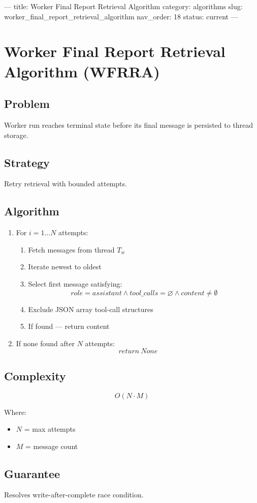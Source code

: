 ---
title: Worker Final Report Retrieval Algorithm
category: algorithms
slug: worker_final_report_retrieval_algorithm
nav_order: 18
status: current
---

\section{Worker Final Report Retrieval Algorithm (WFRRA)}

\subsection*{Problem}

Worker run reaches terminal state before its final message is
persisted to thread storage.

\subsection*{Strategy}

Retry retrieval with bounded attempts.

\subsection*{Algorithm}

\begin{enumerate}

\item For $i = 1 \dots N$ attempts:

\begin{enumerate}
    \item Fetch messages from thread $T_w$
    \item Iterate newest to oldest
    \item Select first message satisfying:
    \[
    role = assistant
    \land tool\_calls = \varnothing
    \land content \neq \emptyset
    \]
    \item Exclude JSON array tool-call structures
    \item If found — return content
\end{enumerate}

\item If none found after $N$ attempts:
\[
return\ None
\]

\end{enumerate}

\subsection*{Complexity}

\[
O(N \cdot M)
\]

Where:
\begin{itemize}
    \item $N$ = max attempts
    \item $M$ = message count
\end{itemize}

\subsection*{Guarantee}

Resolves write-after-complete race condition.